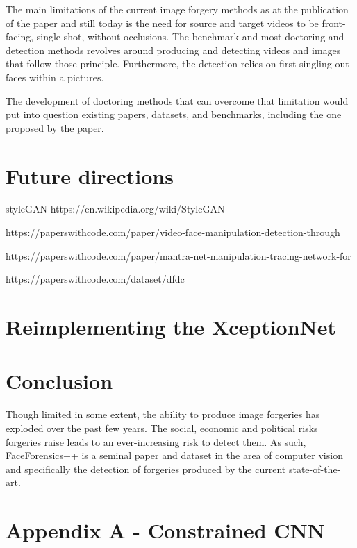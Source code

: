 \documentclass{article} %
\begin{document}
The main limitations of the current image forgery methods as at the publication of the paper and still today is the need for source and target videos to be front-facing, single-shot, without occlusions. The benchmark and most doctoring and detection methods revolves around producing and detecting videos and images that follow those principle. Furthermore, the detection relies on first singling out faces within a pictures.

The development of doctoring methods that can overcome that limitation would put into question existing papers, datasets, and benchmarks, including the one proposed by the paper.

\section{Future directions}

styleGAN https://en.wikipedia.org/wiki/StyleGAN

https://paperswithcode.com/paper/video-face-manipulation-detection-through

https://paperswithcode.com/paper/mantra-net-manipulation-tracing-network-for

https://paperswithcode.com/dataset/dfdc

\section{Reimplementing the XceptionNet}

\section{Conclusion}

Though limited in some extent, the ability to produce image forgeries has exploded over the past few years. The social, economic and political risks forgeries raise leads to an ever-increasing risk to detect them. As such, FaceForensics++ is a seminal paper and dataset in the area of computer vision and specifically the detection of forgeries produced by the current state-of-the-art.

\clearpage




\clearpage
\appendix

\section*{Appendix A - Constrained CNN}
\end{document}
